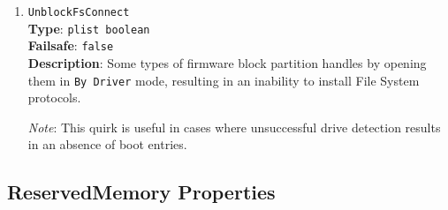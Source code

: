 \documentclass[]{article}
\makeatletter
\renewcommand{\label}[1]{%
\zref@wrapper@immediate{\oldlabel{#1}}}  %
\makeatother
\begin{document}
\begin{enumerate}
  This is an experimental quirk, which should only be used for the aforementioned problem.
  In all other cases, the quirk may render the operating system unstable and is not recommended.
  The recommended solution in the other cases is to install a kernel extension such as
  \href{https://github.com/RehabMan/VoodooTSCSync}{VoodooTSCSync},
  \href{https://github.com/interferenc/TSCAdjustReset}{TSCAdjustReset},
  or \href{https://github.com/lvs1974/CpuTscSync}{CpuTscSync} (a more specialised
  variant of VoodooTSCSync for newer laptops).

  \emph{Note}: This quirk cannot replace the kernel extension because it cannot operate in
  ACPI S3 (sleep wake) mode and because the UEFI firmware only provides very limited
  multicore support which prevents precise updates of the MSR registers.

\item
  \texttt{UnblockFsConnect}\\
  \textbf{Type}: \texttt{plist\ boolean}\\
  \textbf{Failsafe}: \texttt{false}\\
  \textbf{Description}: Some types of firmware block partition handles by opening them
  in \texttt{By\ Driver} mode, resulting in an inability to install File System protocols.

  \emph{Note}: This quirk is useful in cases where unsuccessful drive detection
  results in an absence of boot entries.

\end{enumerate}

\subsection{ReservedMemory Properties}\label{uefirsvdprops}
\end{document}
